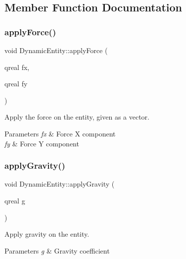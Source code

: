 \subsection{Member Function Documentation}
\mbox{\label{class_dynamic_entity_abc03ef71bd387e232fbcd3e35f9f634d}} 
\subsubsection{\texorpdfstring{apply\+Force()}{applyForce()}}
{\footnotesize\ttfamily void Dynamic\+Entity\+::apply\+Force (\begin{DoxyParamCaption}\item[{qreal}]{fx,  }\item[{qreal}]{fy }\end{DoxyParamCaption})}



Apply the force on the entity, given as a vector. 


\begin{DoxyParams}{Parameters}
{\em fx} & Force X component \\
\hline
{\em fy} & Force Y component \\
\hline
\end{DoxyParams}
\mbox{\label{class_dynamic_entity_ac9d7063f7165c9dc9a050361d9d9ebae}} 
\subsubsection{\texorpdfstring{apply\+Gravity()}{applyGravity()}}
{\footnotesize\ttfamily void Dynamic\+Entity\+::apply\+Gravity (\begin{DoxyParamCaption}\item[{qreal}]{g }\end{DoxyParamCaption})}



Apply gravity on the entity. 


\begin{DoxyParams}{Parameters}
{\em g} & Gravity coefficient \\
\hline
\end{DoxyParams}
\mbox{\label{class_dynamic_entity_acb49f1128f7ddc9b3c531c8c2187d97f}} 
